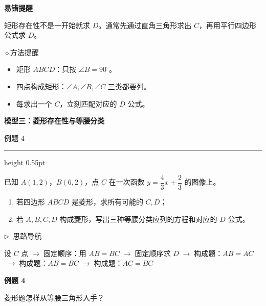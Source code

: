 \documentclass{exam-zh}
\newcommand{\edukai}{\kaishu}
\newcommand{\eduSectionTitle}[1]{%
  \needspace{5\baselineskip}%
  \vspace{2mm}
  {\color{edu-blue}\bfseries\large #1}\par
  \vspace{3mm}
}
\newcommand{\eduSubTitle}[1]{%
  \needspace{4\baselineskip}%
  \vspace{1mm}
  {\color{edu-blue}\bfseries #1}\par
  \vspace{1mm}
}
\newenvironment{eduSubQuestionItem}[1]{%
  \needspace{4\baselineskip}%
  \vspace{2mm}
  \par\noindent
  \hangindent=8mm\hangafter=1
  {\color{edu-blue}\bfseries #1}\enspace
  \begingroup
  \color{edu-ink}
}{%
  \endgroup
  \par
  \vspace{3mm}
}
\newenvironment{eduAuxItem}[1]{%
  \needspace{4\baselineskip}%
  \vspace{2mm}
  \par\noindent
  \hangindent=8mm\hangafter=1
  {\color{edu-blue}\edukai $\triangleright$~#1}\enspace
  \begingroup
  \color{edu-ink}
  \edukai
}{%
  \endgroup
  \par
  \vspace{4mm}
}
\newcommand{\eduIconPin}{\(\diamond\)}
\newenvironment{eduProblemBlock}[1][题目]{%
  \needspace{8\baselineskip}
  {\small\color{edu-muted}#1}\par
  \vspace{1.5mm}
  {\color{edu-blue}\hrule height 0.55pt}
  \vspace{4.5mm}
  \begingroup
  \color{edu-ink}
  \large
  \setlength{\parskip}{2.2mm}
  \linespread{1.20}\selectfont
}{%
  \par
  \endgroup
  \vspace{6mm}
}
\newenvironment{eduBulletList}{%
  \begin{itemize}[
    label=\textbullet,
    leftmargin=5mm,
    itemsep=1.2mm,
    topsep=0pt,
    parsep=0pt
  ]
}{%
  \end{itemize}
}
\begin{document}
\begin{eduMistakeBox}
\eduSubTitle{易错提醒}矩形存在性不是一开始就求 $D$。通常先通过直角三角形求出 $C$，再用平行四边形公式求 $D$。
\end{eduMistakeBox}




\begin{eduSummaryBlock}{\eduIconPin}{方法提醒}
\begin{eduBulletList}
  \item 矩形 $ABCD$：只按 $\angle B=90^\circ$。  \item 四点构成矩形：$\angle A,\angle B,\angle C$ 三类都要列。  \item 每求出一个 $C$，立刻匹配对应的 $D$ 公式。\end{eduBulletList}
\end{eduSummaryBlock}



\clearpage
\eduSectionTitle{模型三：菱形存在性与等腰分类}

\begin{eduProblemBlock}[例题 4]
已知 $A(1,2)$，$B(6,2)$，点 $C$ 在一次函数 $y=\dfrac43x+\dfrac23$ 的图像上。
\begin{enumerate}[label=(\arabic*)]
  \item 若四边形 $ABCD$ 是菱形，求所有可能的 $C,D$；
  \item 若 $A,B,C,D$ 构成菱形，写出三种等腰分类应列的方程和对应的 $D$ 公式。
\end{enumerate}

\end{eduProblemBlock}





\begin{eduAuxItem}{思路导航}
设 $C$ 点$\;\to\;$固定顺序：用 $AB=BC$$\;\to\;$固定顺序求 $D$$\;\to\;$构成题：$AB=AC$$\;\to\;$构成题：$AB=BC$$\;\to\;$构成题：$AC=BC$\end{eduAuxItem}




\begin{eduSubQuestionItem}{例题 4}
菱形题怎样从等腰三角形入手？\end{eduSubQuestionItem}
\end{document}
